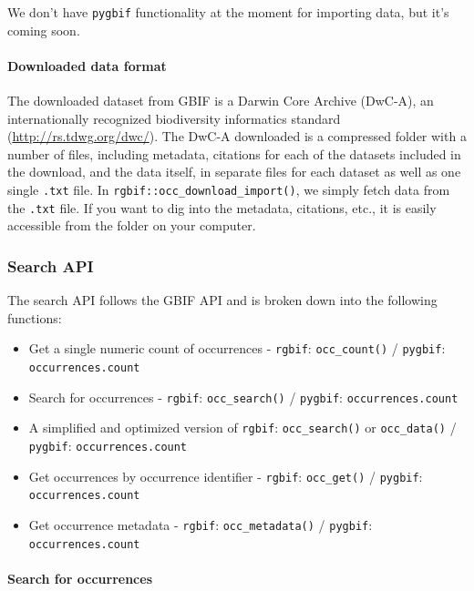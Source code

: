 \documentclass[author-year, review, 11pt]{components/elsarticle} %
\begin{document}
We don't have \texttt{pygbif} functionality at the moment for importing
data, but it's coming soon.

\paragraph{Downloaded data format}\label{downloaded-data-format}

The downloaded dataset from GBIF is a Darwin Core Archive (DwC-A), an
internationally recognized biodiversity informatics standard
(\href{http://rs.tdwg.org/dwc/}{\url{http://rs.tdwg.org/dwc/}}). The
DwC-A downloaded is a compressed folder with a number of files,
including metadata, citations for each of the datasets included in the
download, and the data itself, in separate files for each dataset as
well as one single \texttt{.txt} file. In
\texttt{rgbif::occ\_download\_import()}, we simply fetch data from the
\texttt{.txt} file. If you want to dig into the metadata, citations,
etc., it is easily accessible from the folder on your computer.

\subsubsection{Search API}\label{search-api}

The search API follows the GBIF API and is broken down into the
following functions:

\begin{itemize}
\itemsep1pt\parskip0pt
\item
  Get a single numeric count of occurrences - \texttt{rgbif}:
  \texttt{occ\_count()} / \texttt{pygbif}: \texttt{occurrences.count}
\item
  Search for occurrences - \texttt{rgbif}: \texttt{occ\_search()} /
  \texttt{pygbif}: \texttt{occurrences.count}
\item
  A simplified and optimized version of \texttt{rgbif}:
  \texttt{occ\_search()} or \texttt{occ\_data()} / \texttt{pygbif}:
  \texttt{occurrences.count}
\item
  Get occurrences by occurrence identifier - \texttt{rgbif}:
  \texttt{occ\_get()} / \texttt{pygbif}: \texttt{occurrences.count}
\item
  Get occurrence metadata - \texttt{rgbif}: \texttt{occ\_metadata()} /
  \texttt{pygbif}: \texttt{occurrences.count}
\end{itemize}

\paragraph{Search for occurrences}\label{search-for-occurrences}
\end{document}
